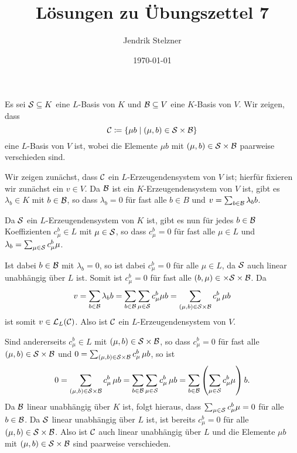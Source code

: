 \documentclass[a4paper,10pt]{scrartcl}
\title{Lösungen zu Übungszettel 7}
\author{Jendrik Stelzner}
\date{\today}
\begin{document}
\maketitle









\addtocounter{section}{1}










\section{}
Es sei $\mathcal{S} \subseteq K$ eine $L$-Basis von $K$ und $\mathcal{B} \subseteq V$ eine $K$-Basis von $V$. Wir zeigen, dass
\[
 \mathcal{C} \coloneqq \{\mu b \mid (\mu, b) \in \mathcal{S} \times \mathcal{B}\}
\]
eine $L$-Basis von $V$ ist, wobei die Elemente $\mu b$ mit $(\mu, b) \in \mathcal{S} \times \mathcal{B}$ paarweise verschieden sind.

Wir zeigen zunächst, dass $\mathcal{C}$ ein $L$-Erzeugendensystem von $V$ ist; hierfür fixieren wir zunächst ein $v \in V$. Da $\mathcal{B}$ ist ein $K$-Erzeugendensystem von $V$ ist, gibt es $\lambda_b \in K$ mit $b \in \mathcal{B}$, so dass $\lambda_b = 0$ für fast alle $b \in B$ und $v = \sum_{b \in \mathcal{B}} \lambda_b b$.

Da $\mathcal{S}$ ein $L$-Erzeugendensystem von $K$ ist, gibt es nun für jedes $b \in \mathcal{B}$ Koeffizienten $c^b_\mu \in L$ mit $\mu \in \mathcal{S}$, so dass $c^b_\mu = 0$ für fast alle $\mu \in L$ und $\lambda_b = \sum_{\mu \in \mathcal{S}} c^b_\mu \mu$.

Ist dabei $b \in \mathcal{B}$ mit $\lambda_b = 0$, so ist dabei $c^b_\mu = 0$ für alle $\mu \in L$, da $\mathcal{S}$ auch linear unabhängig über $L$ ist. Somit ist $c^b_\mu = 0$ für fast alle $(b,\mu) \in  \times \mathcal{S} \times \mathcal{B}$. Da
\[
 v
 = \sum_{b \in \mathcal{B}} \lambda_b b
 = \sum_{b \in \mathcal{B}} \sum_{\mu \in \mathcal{S}} c^b_\mu \mu b
 = \sum_{(\mu,b) \in \mathcal{S} \times \mathcal{B}} c^b_\mu \, \mu b
\]
ist somit $v \in \mathcal{L}_L(\mathcal{C})$. Also ist $\mathcal{C}$ ein $L$-Erzeugendensystem von $V$.

Sind andererseits $c^b_\mu \in L$ mit $(\mu,b) \in \mathcal{S} \times \mathcal{B}$, so dass $c^b_\mu = 0$ für fast alle $(\mu,b) \in \mathcal{S} \times \mathcal{B}$ und $0 = \sum_{(\mu,b) \in \mathcal{S} \times \mathcal{B}} c^b_\mu \, \mu b$, so ist
\[
 0
 = \sum_{(\mu,b) \in \mathcal{S} \times \mathcal{B}} c^b_\mu \, \mu b
 = \sum_{b \in \mathcal{B}} \sum_{\mu \in \mathcal{S}} c^b_\mu \, \mu b
 = \sum_{b \in \mathcal{B}} \left( \sum_{\mu \in \mathcal{S}} c^b_\mu \mu \right) b.
\]
Da $\mathcal{B}$ linear unabhängig über $K$ ist, folgt hieraus, dass $\sum_{\mu \in \mathcal{S}} c^b_\mu \mu = 0$ für alle $b \in \mathcal{B}$. Da $\mathcal{S}$ linear unabhängig über $L$ ist, ist bereits $c^b_\mu = 0$ für alle $(\mu,b) \in \mathcal{S} \times \mathcal{B}$. Also ist $\mathcal{C}$ auch linear unabhängig über $L$ und die Elemente $\mu b$ mit $(\mu,b) \in \mathcal{S} \times \mathcal{B}$ sind paarweise verschieden.
\end{document}
